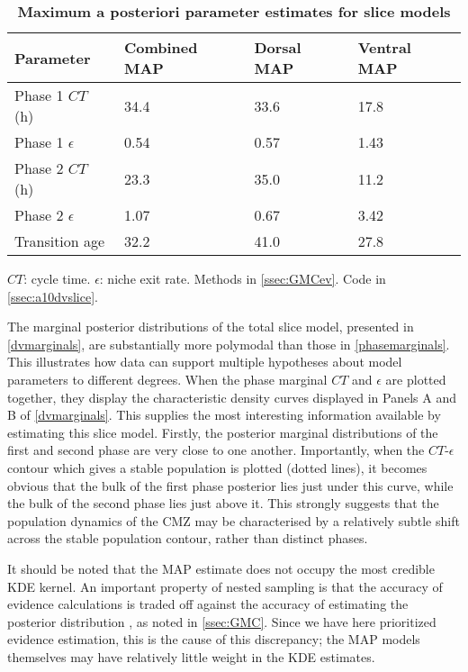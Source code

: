 \begin{table}[!ht]
    \centering
    \caption{{\bf Maximum a posteriori parameter estimates for slice models}}
    \begin{tabular}{|l|l|l|l|}
        \hline
        {\bf Parameter} & {\bf Combined MAP} & {\bf Dorsal MAP} & {\bf Ventral MAP}\\ \hline
        Phase 1 $CT$ (h) & 34.4 & 33.6 & 17.8\\ \hline
        Phase 1 $\epsilon$ & 0.54 & 0.57 & 1.43\\ \hline
        Phase 2 $CT$ (h) & 23.3 & 35.0 & 11.2\\ \hline
        Phase 2 $\epsilon$ & 1.07 & 0.67 & 3.42\\ \hline
        Transition age & 32.2 & 41.0 & 27.8\\ \hline
        \end{tabular}
    \begin{flushleft}
        $CT$: cycle time.
        $\epsilon$: niche exit rate.
        Methods in \autoref{ssec:GMCev}.
        Code in \autoref{ssec:a10dvslice}.    
    \end{flushleft}
    \label{dvMAPtable}
\end{table}

The marginal posterior distributions of the total slice model, presented in \autoref{dvmarginals}, are substantially more polymodal than those in \autoref{phasemarginals}. This illustrates how data can support multiple hypotheses about model parameters to different degrees. When the phase marginal $CT$ and $\epsilon$ are plotted together, they display the characteristic density curves displayed in Panels A and B of \autoref{dvmarginals}. This supplies the most interesting information available by estimating this slice model. Firstly, the posterior marginal distributions of the first and second phase are very close to one another. Importantly, when the $CT$-$\epsilon$ contour which gives a stable population is plotted (dotted lines), it becomes obvious that the bulk of the first phase posterior lies just under this curve, while the bulk of the second phase lies just above it. This strongly suggests that the population dynamics of the CMZ may be characterised by a relatively subtle shift across the stable population contour, rather than distinct phases.

It should be noted that the MAP estimate does not occupy the most credible KDE kernel. An important property of nested sampling is that the accuracy of evidence calculations is traded off against the accuracy of estimating the posterior distribution \cite{Speagle2019}, as noted in \autoref{ssec:GMC}. Since we have here prioritized evidence estimation, this is the cause of this discrepancy; the MAP models themselves may have relatively little weight in the KDE estimates.

